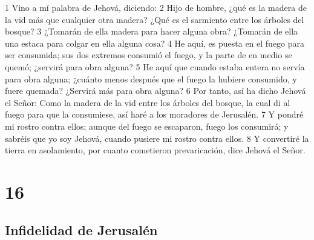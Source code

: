 1 Vino a mí palabra de Jehová, diciendo:
2 Hijo de hombre, ¿qué es la madera de la vid más que cualquier otra madera? ¿Qué es el sarmiento entre los árboles del bosque?
3 ¿Tomarán de ella madera para hacer alguna obra? ¿Tomarán de ella una estaca para colgar en ella alguna cosa?
4 He aquí, es puesta en el fuego para ser consumida; sus dos extremos consumió el fuego, y la parte de en medio se quemó; ¿servirá para obra alguna?
5 He aquí que cuando estaba entera no servía para obra alguna; ¿cuánto menos después que el fuego la hubiere consumido, y fuere quemada? ¿Servirá más para obra alguna?
6 Por tanto, así ha dicho Jehová el Señor: Como la madera de la vid entre los árboles del bosque, la cual di al fuego para que la consumiese, así haré a los moradores de Jerusalén.
7 Y pondré mi rostro contra ellos; aunque del fuego se escaparon, fuego los consumirá; y sabréis que yo soy Jehová, cuando pusiere mi rostro contra ellos.
8 Y convertiré la tierra en asolamiento, por cuanto cometieron prevaricación, dice Jehová el Señor.

\chapter{16}

\section*{Infidelidad de Jerusalén}


